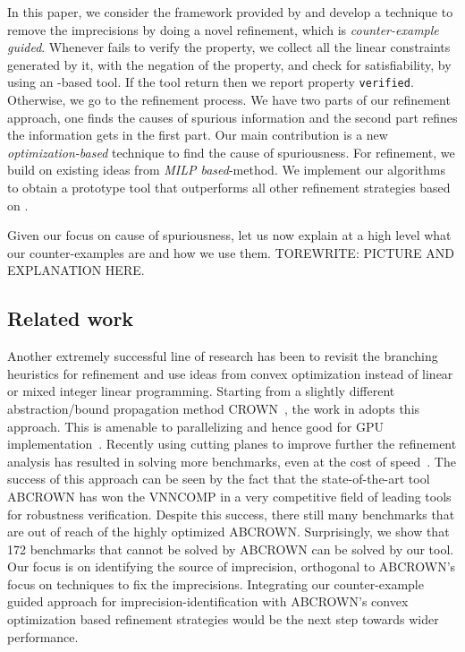 In this paper, we consider the framework provided by \deeppoly{} and develop a technique to remove the imprecisions by doing a novel refinement, which is \emph{counter-example guided}. Whenever \deeppoly{} fails to verify the property, we collect all the linear constraints generated by it, with the negation of the property, and check for satisfiability, by using an \milp{}-based tool.  If the tool return \unsat{} then we report property \texttt{verified}. Otherwise, we go to the refinement process. We have two parts of our refinement approach, one finds the causes of spurious information  and the second part refines the information gets in the first part.  Our main contribution is a new {\em optimization-based} technique to find the cause of spuriousness. For refinement, we build on existing ideas from {\em MILP based}-method. We implement our algorithms to obtain a prototype tool that outperforms all other refinement strategies based on \deeppoly{}.

Given our focus on cause of spuriousness, let us now explain at a high level what our counter-examples are and how we use them. TOREWRITE: PICTURE AND EXPLANATION HERE.



\subsection{Related work}
Another extremely successful line of research has been to revisit the branching heuristics for refinement and use ideas from convex optimization instead of linear or mixed integer linear programming. Starting from a slightly different abstraction/bound propagation method CROWN~\cite{crown}, the work in \cite{betacrown} adopts this approach. This is amenable to parallelizing and hence good for GPU implementation~\cite{gpucrown}. Recently using cutting planes to improve further the refinement analysis has resulted in solving more benchmarks, even at the cost of speed~\cite{cutting-planes}. The success of this approach can be seen by the fact that the state-of-the-art tool ABCROWN has won the VNNCOMP in a very competitive field of leading tools for robustness verification. Despite this success, there still many benchmarks that are out of reach of the highly optimized ABCROWN. Surprisingly, we show that 172 benchmarks that cannot be solved by ABCROWN can be solved by our tool. Our focus is on identifying the source of imprecision, orthogonal to ABCROWN's focus on techniques to fix the imprecisions. Integrating our counter-example guided approach for imprecision-identification with ABCROWN's convex optimization based refinement strategies would be the next step towards wider performance. %




